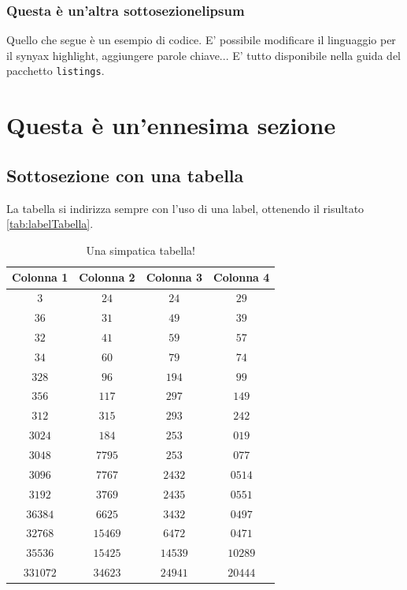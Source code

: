 \subsubsection{Questa è un'altra sottosezionelipsum}

Quello che segue è un esempio di codice. E' possibile modificare il linguaggio per il synyax highlight, aggiungere parole chiave... E' tutto disponibile nella guida del pacchetto \texttt{listings}.

 

\section{Questa è un'ennesima sezione}

\lipsum[4]

\subsection{Sottosezione con una tabella}

La tabella si indirizza sempre con l'uso di una label, ottenendo il risultato \autoref{tab:labelTabella}.

\begin{table}
    \caption{Una simpatica tabella!}\label{tab:labelTabella}
    \begin{center}
    \begin{tabular}{c|c|c|c}
        \textbf{Colonna 1} & \textbf{Colonna 2} & \textbf{Colonna 3} & \textbf{Colonna 4} \\
        \hline
            $3$      & $24$     & $24$    & $29$ \\ 
            $36$     & $31$     & $49$    & $39$ \\ 
            $32$     & $41$     & $59$    & $57$ \\ 
            $34$     & $60$     & $79$    & $74$ \\ 
            $328$    & $96$     & $194$   & $99$ \\ 
            $356$    & $117$    & $297$   & $149$ \\ 
            $312$    & $315$    & $293$   & $242$ \\ 
            $3024$   & $184$    & $253$   & $019$ \\ 
            $3048$   & $7795$   & $253$   & $077$ \\ 
            $3096$   & $7767$   & $2432$  & $0514$ \\ 
            $3192$   & $3769$   & $2435$  & $0551$ \\ 
            $36384$  & $6625$   & $3432$  & $0497$ \\ 
            $32768$  & $15469$  & $6472$  & $0471$ \\ 
            $35536$  & $15425$  & $14539$ & $10289$ \\ 
            $331072$ & $34623$  & $24941$ & $20444$ \\  
        \end{tabular}
    \end{center}
\end{table}